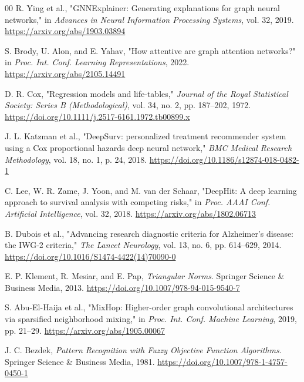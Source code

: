 \documentclass[conference]{IEEEtran}
\begin{document}
\begin{thebibliography}{00}
R. Ying et al., "GNNExplainer: Generating explanations for graph neural networks," in \textit{Advances in Neural Information Processing Systems}, vol. 32, 2019. \href{https://arxiv.org/abs/1903.03894}{https://arxiv.org/abs/1903.03894}

S. Brody, U. Alon, and E. Yahav, "How attentive are graph attention networks?" in \textit{Proc. Int. Conf. Learning Representations}, 2022. \href{https://arxiv.org/abs/2105.14491}{https://arxiv.org/abs/2105.14491}

D. R. Cox, "Regression models and life-tables," \textit{Journal of the Royal Statistical Society: Series B (Methodological)}, vol. 34, no. 2, pp. 187--202, 1972. \href{https://doi.org/10.1111/j.2517-6161.1972.tb00899.x}{https://doi.org/10.1111/j.2517-6161.1972.tb00899.x}

J. L. Katzman et al., "DeepSurv: personalized treatment recommender system using a Cox proportional hazards deep neural network," \textit{BMC Medical Research Methodology}, vol. 18, no. 1, p. 24, 2018. \href{https://doi.org/10.1186/s12874-018-0482-1}{https://doi.org/10.1186/s12874-018-0482-1}

C. Lee, W. R. Zame, J. Yoon, and M. van der Schaar, "DeepHit: A deep learning approach to survival analysis with competing risks," in \textit{Proc. AAAI Conf. Artificial Intelligence}, vol. 32, 2018. \href{https://arxiv.org/abs/1802.06713}{https://arxiv.org/abs/1802.06713}

B. Dubois et al., "Advancing research diagnostic criteria for Alzheimer's disease: the IWG-2 criteria," \textit{The Lancet Neurology}, vol. 13, no. 6, pp. 614--629, 2014. \href{https://doi.org/10.1016/S1474-4422(14)70090-0}{https://doi.org/10.1016/S1474-4422(14)70090-0}

E. P. Klement, R. Mesiar, and E. Pap, \textit{Triangular Norms}. Springer Science \& Business Media, 2013. \href{https://doi.org/10.1007/978-94-015-9540-7}{https://doi.org/10.1007/978-94-015-9540-7}

S. Abu-El-Haija et al., "MixHop: Higher-order graph convolutional architectures via sparsified neighborhood mixing," in \textit{Proc. Int. Conf. Machine Learning}, 2019, pp. 21--29. \href{https://arxiv.org/abs/1905.00067}{https://arxiv.org/abs/1905.00067}

J. C. Bezdek, \textit{Pattern Recognition with Fuzzy Objective Function Algorithms}. Springer Science \& Business Media, 1981. \href{https://doi.org/10.1007/978-1-4757-0450-1}{https://doi.org/10.1007/978-1-4757-0450-1}


\end{thebibliography}
\end{document}
